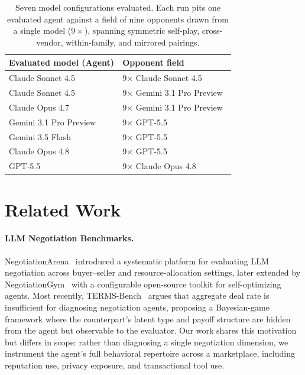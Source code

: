 \documentclass{article} %
\begin{document}
\begin{table}[t]
\begin{center}
\small
\setlength{\tabcolsep}{2pt}
\begin{tabular}{@{}ll@{}}
\toprule
Evaluated model (Agent) & Opponent field \\
\midrule
Claude Sonnet 4.5~\citep{anthropic2025sonnet45}  & 9$\times$ Claude Sonnet 4.5 \\
Claude Sonnet 4.5         & 9$\times$ Gemini 3.1 Pro Preview~\citep{google2026gemini31pro} \\
Claude Opus 4.7~\citep{anthropic2026opus47}    & 9$\times$ Gemini 3.1 Pro Preview \\
Gemini 3.1 Pro Preview    & 9$\times$ GPT-5.5~\citep{openai2026gpt55} \\
Gemini 3.5 Flash~\citep{google2026gemini35flash} & 9$\times$ GPT-5.5 \\
Claude Opus 4.8~\citep{anthropic2026opus48}    & 9$\times$ GPT-5.5 \\
GPT-5.5                   & 9$\times$ Claude Opus 4.8 \\
\bottomrule
\end{tabular}
\end{center}
\caption{Seven model configurations evaluated. Each run pits one evaluated agent against a field of nine opponents drawn from a single model ($9\times$), spanning symmetric self-play, cross-vendor, within-family, and mirrored pairings.}
\label{tab:configs}
\end{table}

\section{Related Work}

\paragraph{LLM Negotiation Benchmarks.}
NegotiationArena~\citep{negotiationarena2024} introduced a systematic platform for evaluating LLM negotiation across buyer--seller and resource-allocation settings, later extended by NegotiationGym~\citep{negotiationgym2025} with a configurable open-source toolkit for self-optimizing agents. Most recently, TERMS-Bench~\citep{termsbench2026} argues that aggregate deal rate is insufficient for diagnosing negotiation agents, proposing a Bayesian-game framework where the counterpart's latent type and payoff structure are hidden from the agent but observable to the evaluator. Our work shares this motivation but differs in scope: rather than diagnosing a single negotiation dimension, we instrument the agent's full behavioral repertoire across a marketplace, including reputation use, privacy exposure, and transactional tool use.
\end{document}
